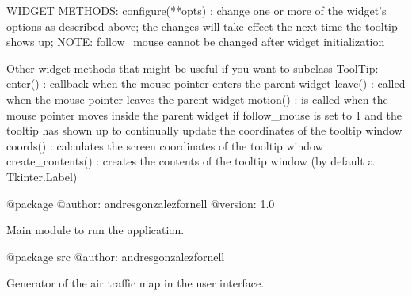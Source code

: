 \begin{DoxyVerb}
WIDGET METHODS:
configure(**opts) : change one or more of the widget's options as described above; the changes will take effect the
    next time the tooltip shows up; NOTE: follow_mouse cannot be changed after widget initialization

Other widget methods that might be useful if you want to subclass ToolTip:
enter() :           callback when the mouse pointer enters the parent widget
leave() :           called when the mouse pointer leaves the parent widget
motion() :          is called when the mouse pointer moves inside the parent widget if follow_mouse is set to 1 and the
    tooltip has shown up to continually update the coordinates of the tooltip window
coords() :          calculates the screen coordinates of the tooltip window
create_contents() : creates the contents of the tooltip window (by default a Tkinter.Label)
\end{DoxyVerb}


\begin{DoxyVerb}@package 
@author: andresgonzalezfornell
@version: 1.0

Main module to run the application.
\end{DoxyVerb}


\begin{DoxyVerb}@package src 
@author: andresgonzalezfornell

Generator of the air traffic map in the user interface.
\end{DoxyVerb}
 